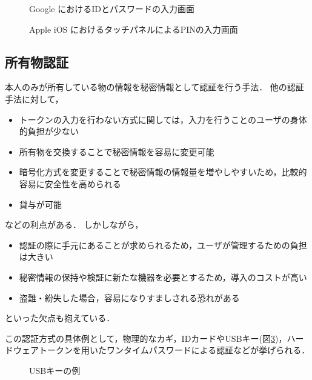 \begin{figure}[th]
\begin{center}
\end{center}
\caption{Google におけるIDとパスワードの入力画面}
\label{fig:loginGoogleWithIDAndPass}
\end{figure}

\begin{figure}[th]
\begin{center}
\end{center}
\caption{Apple iOS におけるタッチパネルによるPINの入力画面}
\label{fig:iosPIN}
\end{figure}

\subsection{所有物認証}\label{subsec:possession}
本人のみが所有している物の情報を秘密情報として認証を行う手法．
他の認証手法に対して，
\begin{itemize}
\item トークンの入力を行わない方式に関しては，入力を行うことのユーザの身体的負担が少ない
\item 所有物を交換することで秘密情報を容易に変更可能
\item 暗号化方式を変更することで秘密情報の情報量を増やしやすいため，比較的容易に安全性を高められる
\item 貸与が可能
\end{itemize}
などの利点がある．
しかしながら，
\begin{itemize}
\item 認証の際に手元にあることが求められるため，ユーザが管理するための負担は大きい
\item 秘密情報の保持や検証に新たな機器を必要とするため，導入のコストが高い
\item 盗難・紛失した場合，容易になりすましされる恐れがある
\end{itemize}
といった欠点も抱えている．

この認証方式の具体例として，物理的なカギ，IDカードやUSBキー(図\ref{fig:dongle})，ハードウェアトークンを用いたワンタイムパスワードによる認証などが挙げられる．

\begin{figure}[th]
\begin{center}
\end{center}
\caption{USBキーの例}
\label{fig:dongle}
\end{figure}


